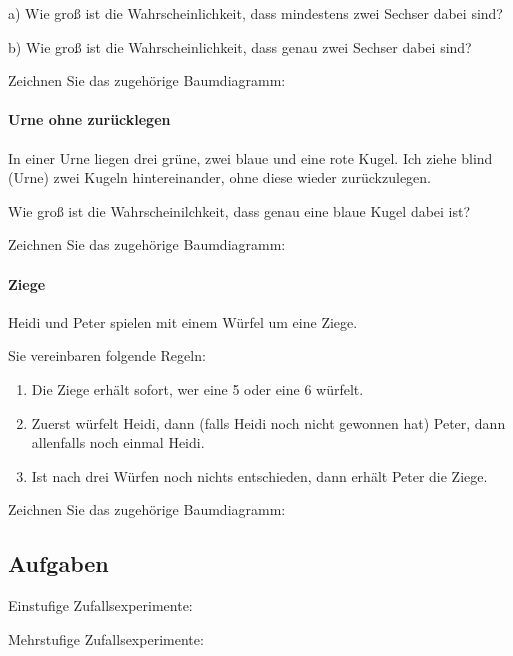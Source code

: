 a) Wie groß ist die Wahrscheinlichkeit, dass mindestens zwei Sechser dabei sind?

b) Wie groß ist die Wahrscheinlichkeit, dass genau zwei Sechser dabei sind?

Zeichnen Sie das zugehörige Baumdiagramm:

\newpage


\paragraph{Urne ohne zurücklegen} In einer Urne liegen drei grüne, zwei blaue und eine rote Kugel. Ich ziehe blind (Urne) zwei Kugeln hintereinander, ohne diese wieder zurückzulegen.

Wie groß ist die Wahrscheinilchkeit, dass genau eine blaue Kugel dabei ist?

Zeichnen Sie das zugehörige Baumdiagramm:

\newpage

\paragraph{Ziege} Heidi und Peter spielen mit einem Würfel um eine Ziege.

Sie vereinbaren folgende Regeln:

\begin{enumerate}
\item Die Ziege erhält sofort, wer eine 5 oder eine 6 würfelt.
\item Zuerst würfelt Heidi, dann (falls Heidi noch nicht gewonnen hat) Peter, dann allenfalls noch einmal Heidi.
\item Ist nach drei Würfen noch nichts entschieden, dann erhält Peter die Ziege.
\end{enumerate}


Zeichnen Sie das zugehörige Baumdiagramm:


\subsection*{Aufgaben}
Einstufige Zufallsexperimente:


Mehrstufige Zufallsexperimente:

